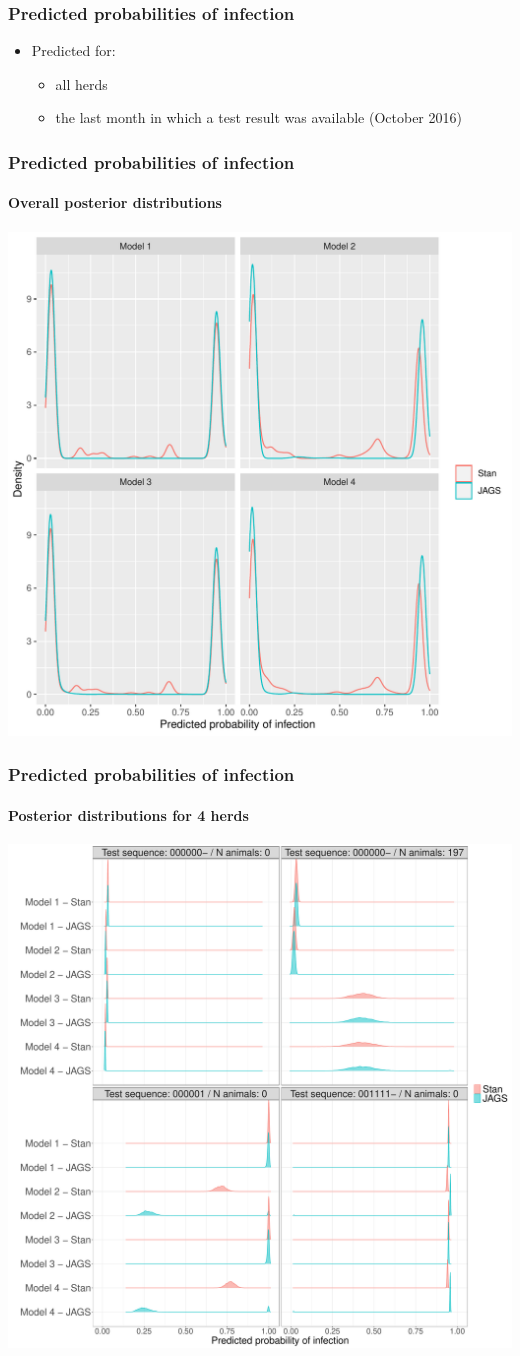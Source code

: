 \documentclass{beamer}
\begin{document}
\begin{frame}
\frametitle{Predicted probabilities of infection}
\begin{itemize}
 \item{Predicted for:}
 \begin{itemize}
 \item{all herds}
 \item{the last month in which a test result was available (October 2016)}
 \end{itemize}
\end{itemize}
\end{frame}

\begin{frame}
\frametitle{Predicted probabilities of infection}
\framesubtitle{Overall posterior distributions}
\centering
\includegraphics[width=.72\textwidth]{imgs/plot_predicted_proba_all_herds.pdf}
\end{frame}

\begin{frame}
\frametitle{Predicted probabilities of infection}
\framesubtitle{Posterior distributions for 4 herds}
\centering
\includegraphics[width=.72\textwidth]{imgs/plot_predicted_proba_4herds.pdf}
\end{frame}
\end{document}
